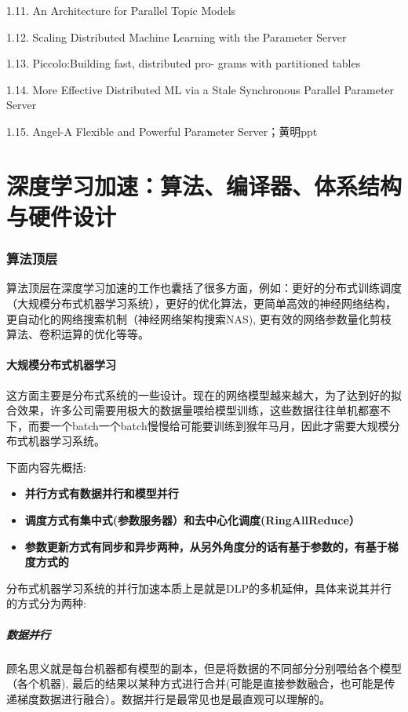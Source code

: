 \documentclass[12pt]{article}
\begin{document}
1.11. An Architecture for Parallel Topic Models

1.12. Scaling Distributed Machine Learning with the Parameter Server

1.13. Piccolo:Building fast, distributed pro- grams with partitioned tables 


1.14. More Effective Distributed ML via a Stale Synchronous Parallel Parameter Server

1.15. Angel-A Flexible and Powerful Parameter Server；黄明ppt

\part{深度学习加速：算法、编译器、体系结构与硬件设计\cite{Deep_Learning_Speed_Up}}
\setcounter{section}{0}
\section{算法顶层}
算法顶层在深度学习加速的工作也囊括了很多方面，例如：更好的分布式训练调度（大规模分布式机器学习系统），更好的优化算法，更简单高效的神经网络结构，更自动化的网络搜索机制（神经网络架构搜索NAS), 更有效的网络参数量化剪枝算法、卷积运算的优化等等。

\subsection{大规模分布式机器学习}
这方面主要是分布式系统的一些设计。现在的网络模型越来越大，为了达到好的拟合效果，许多公司需要用极大的数据量喂给模型训练，这些数据往往单机都塞不下，而要一个batch一个batch慢慢给可能要训练到猴年马月，因此才需要大规模分布式机器学习系统。

下面内容先概括:
\begin{itemize}
\setlength{\itemsep}{0pt}
\setlength{\parsep}{0pt}
\setlength{\parskip}{0pt}
    \item \textbf{并行方式有数据并行和模型并行}
    \item \textbf{调度方式有集中式(参数服务器）和去中心化调度(RingAllReduce）}
    \item \textbf{参数更新方式有同步和异步两种，从另外角度分的话有基于参数的，有基于梯度方式的}
\end{itemize}

分布式机器学习系统的并行加速本质上是就是DLP的多机延伸，具体来说其并行的方式分为两种:
\subsubsection{数据并行}
顾名思义就是每台机器都有模型的副本，但是将数据的不同部分分别喂给各个模型（各个机器), 最后的结果以某种方式进行合并(可能是直接参数融合，也可能是传递梯度数据进行融合）。数据并行是最常见也是最直观可以理解的。
\end{document}
